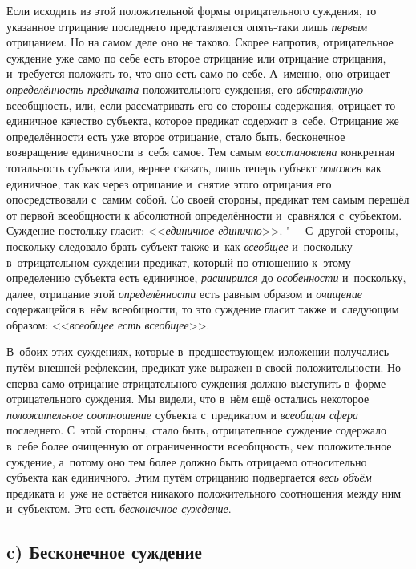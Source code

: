Если исходить из этой положительной формы отрицательного суждения, то указанное
отрицание последнего представляется опять-таки лишь {\em первым} отрицанием.
Но на самом деле оно не таково. Скорее напротив, отрицательное суждение уже
само по себе есть второе отрицание или отрицание отрицания, и~требуется
положить то, что оно есть само по себе. А~именно, оно отрицает
{\em определённость предиката} положительного суждения, его {\em абстрактную}
всеобщность, или, если рассматривать его со стороны содержания, отрицает то
единичное качество субъекта, которое предикат содержит в~себе. Отрицание же
определённости есть уже второе отрицание, стало быть, бесконечное возвращение
единичности в~себя самое. Тем самым {\em восстановлена} конкретная тотальность
субъекта или, вернее сказать, лишь теперь субъект {\em положен} как единичное,
так как через отрицание и~снятие этого отрицания его опосредствовали с~самим
собой. Со своей стороны, предикат тем самым перешёл от первой всеобщности к
абсолютной определённости и~сравнялся с~субъектом. Суждение постольку гласит:
<<{\em единичное единично}>>. "--- С~другой стороны, поскольку следовало брать
субъект также и~как {\em всеобщее} и~поскольку в~отрицательном суждении
предикат, который по отношению к~этому определению субъекта есть единичное,
{\em расширился} до {\em особенности} и~поскольку, далее, отрицание этой
{\em определённости} есть равным образом и {\em очищение} содержащейся в~нём
всеобщности, то это суждение гласит также и~следующим образом:
<<{\em всеобщее есть всеобщее}>>.

В~обоих этих суждениях, которые в~предшествующем
изложении
получались путём внешней рефлексии, предикат уже выражен в
своей положительности. Но сперва само отрицание отрицательного суждения
должно выступить в~форме отрицательного суждения. Мы видели, что в~нём ещё
остались некоторое {\em положительное соотношение} субъекта с~предикатом и
{\em всеобщая сфера} последнего. С~этой стороны, стало быть,
отрицательное суждение содержало в~себе более очищенную от ограниченности
всеобщность, чем положительное суждение, а~потому оно тем более должно быть
отрицаемо относительно субъекта как единичного. Этим путём отрицанию
подвергается {\em весь объём} предиката и~уже не остаётся никакого
положительного соотношения между ним и~субъектом. Это есть
{\em бесконечное суждение}.

\subsection[c) Бесконечное суждение]{c) Бесконечное суждение}


